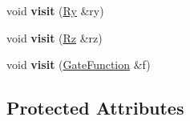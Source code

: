 \begin{DoxyCompactItemize}
\item 
void {\bfseries visit} (\hyperlink{a00257}{Ry} \&ry)\hypertarget{a00110_aa22aad7b316386f5ef35672337c05ffc}{}\label{a00110_aa22aad7b316386f5ef35672337c05ffc}

\item 
void {\bfseries visit} (\hyperlink{a00258}{Rz} \&rz)\hypertarget{a00110_a8857ecf8f8f1b6143da8f31a722fe03e}{}\label{a00110_a8857ecf8f8f1b6143da8f31a722fe03e}

\item 
void {\bfseries visit} (\hyperlink{a00111}{Gate\+Function} \&f)\hypertarget{a00110_ad7d15225cf258fe59660ba828baff357}{}\label{a00110_ad7d15225cf258fe59660ba828baff357}

\end{DoxyCompactItemize}
\subsection*{Protected Attributes}
